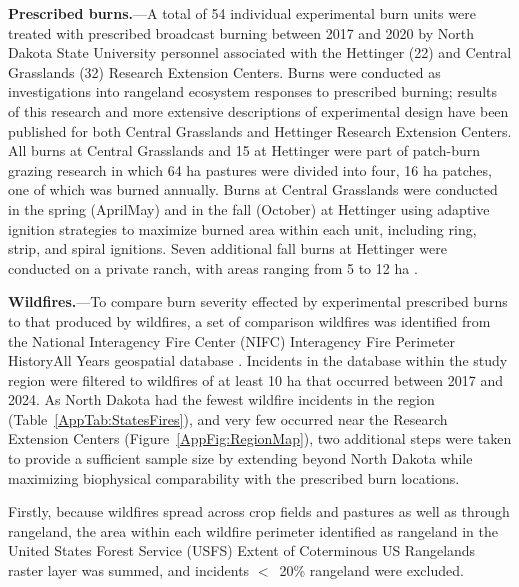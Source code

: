 \documentclass[fire,article,accept,oneauthor,pdftex]{Definitions/mdpi}
\begin{document}
\textbf{Prescribed burns.}---A total of 54 %
 individual experimental burn units were treated with prescribed broadcast burning between 2017 and 2020 by North Dakota State University personnel associated with the Hettinger (22) and Central Grasslands (32) Research Extension Centers. 
Burns were conducted as investigations into rangeland ecosystem responses to prescribed burning; results of this research and more extensive descriptions of experimental design have been published for both Central Grasslands \cite{duquette2022, wanchuk2024, mcgranahan2025a} and Hettinger \cite{spiess2024, spiess2025} Research Extension Centers. 
All burns at Central Grasslands and 15 at Hettinger were part of patch-burn grazing research in which 64 ha pastures were divided into four, 16 ha patches, one of which was burned annually. 
Burns at Central Grasslands were conducted in the spring (April\textendash May) and in the fall (October) at Hettinger using adaptive ignition strategies to maximize burned area within each unit, including ring, strip, and spiral ignitions. 
Seven additional fall burns at Hettinger were conducted on a  private ranch, with areas ranging from 5 to 12 ha \cite{mcgranahan2022}. 

\textbf{Wildfires.}---To compare burn severity effected by experimental prescribed burns to that produced by wildfires, a set of comparison wildfires was identified from the National Interagency Fire Center (NIFC) Interagency Fire Perimeter History\textendash All Years geospatial database \cite{nifc2024}. 
Incidents in the database within the study region were filtered to wildfires of at least 10 ha that occurred between 2017 and 2024. 
As North Dakota had the fewest wildfire incidents in the region (Table~\ref{AppTab:StatesFires}), and very few occurred near the Research Extension Centers (Figure~\ref{AppFig:RegionMap}), two additional steps were taken to provide a sufficient sample size by extending beyond North Dakota while maximizing biophysical comparability with the prescribed burn locations.
 
Firstly, because wildfires spread across crop fields and pastures as well as through rangeland, the area within each wildfire perimeter identified as rangeland in the United States Forest Service (USFS) Extent of Coterminous US Rangelands raster layer \cite{usdaforestservicenodate} was summed, and incidents $<$~20\% rangeland were excluded. 
\end{document}
